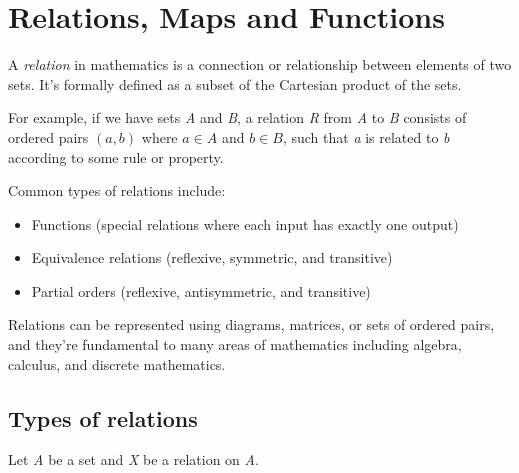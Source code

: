\newpage
\section{Relations, Maps and Functions}

A \emph{relation} in mathematics is a connection or relationship between elements of two sets. It's 
formally defined as a subset of the Cartesian product of the sets.
\vspace{\baselineskip}

For example, if we have sets \emph{A} and \emph{B}, a relation \emph{R} from \emph{A} to \emph{B} consists
of ordered pairs \((a,b)\) where \(a \in A\) and \(b \in B\), such that \emph{a} is related to \emph{b} 
according to some rule or property.
\vspace{\baselineskip}

Common types of relations include:

\begin{itemize}

	\item Functions (special relations where each input has exactly one output)

	\item Equivalence relations (reflexive, symmetric, and transitive)

	\item Partial orders (reflexive, antisymmetric, and transitive)

\end{itemize}

Relations can be represented using diagrams, matrices, or sets of
ordered pairs, and they're fundamental to many areas of mathematics including algebra, calculus, and 
discrete mathematics.

\subsection{Types of relations}

Let \emph{A} be a set and \emph{X} be a relation on \emph{A}.

